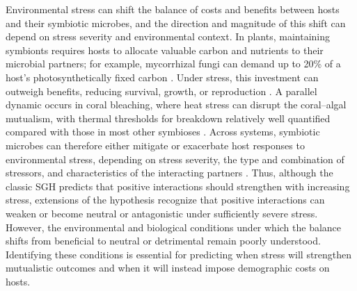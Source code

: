 \documentclass[12pt]{article}\usepackage[]{graphicx}\usepackage[dvipsnames]{xcolor}
\begin{document}
Environmental stress can shift the balance of costs and benefits between hosts and their symbiotic microbes, and the direction and magnitude of this shift can depend on stress severity and environmental context.
In plants, maintaining symbionts requires hosts to allocate valuable carbon and nutrients to their microbial partners; for example, mycorrhizal fungi can demand up to 20\% of a host's photosynthetically fixed carbon \citep{thirkell2020carbon,soudzilovskaia2015quantitative}.
Under stress, this investment can outweigh benefits, reducing survival, growth, or reproduction \citep{johnson1997functioning,bronstein2001exploitation,klironomos2003variation}.
A parallel dynamic occurs in coral bleaching, where heat stress can disrupt the coral--algal mutualism, with thermal thresholds for breakdown relatively well quantified compared with those in most other symbioses \citep{evensen2022empirically,vidal2009coral,marangon2025destabilization}. Across systems, symbiotic microbes can therefore either mitigate or exacerbate host responses to environmental stress, depending on stress severity, the type and combination of stressors, and characteristics of the interacting partners \citep{david2018microbial,michalet2007highlighting,kawai2007testing,le2010interaction}. Thus, although the classic SGH predicts that positive interactions should strengthen with increasing stress, extensions of the hypothesis recognize that positive interactions can weaken or become neutral or antagonistic under sufficiently severe stress.
However, the environmental and biological conditions under which the balance shifts from beneficial to neutral or detrimental remain poorly understood. Identifying these conditions is essential for predicting when stress will strengthen mutualistic outcomes and when it will instead impose demographic costs on hosts.
\end{document}
